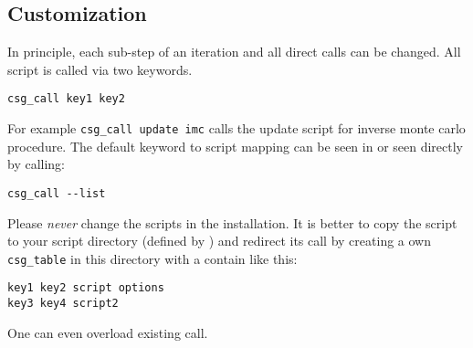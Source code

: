 \subsection{Customization}
In principle, each sub-step of an iteration and all direct calls can be changed. 
All script is called via two keywords.
\begin{verbatim}
csg_call key1 key2
\end{verbatim} 
For example \texttt{csg\_call update imc} calls the update script for inverse monte carlo procedure.
The default keyword to script mapping can be seen in  or seen directly by calling:
\begin{verbatim}
csg_call --list
\end{verbatim} 

Please {\em never} change the scripts in the \votca installation. It is better to copy the script to your script directory (defined by ) and redirect its call by creating a own \texttt{csg\_table} in this directory with a contain like this:
\begin{verbatim}
key1 key2 script options
key3 key4 script2
\end{verbatim} 
One can even overload existing call.
